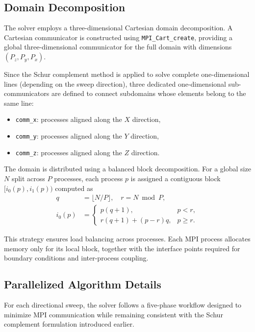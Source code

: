 \documentclass[12pt]{article}
\begin{document}
\subsection{Domain Decomposition}

The solver employs a three-dimensional Cartesian domain decomposition. A Cartesian communicator is constructed using \texttt{MPI\_Cart\_create}, providing a global three-dimensional communicator for the full domain with dimensions $(P_z, P_y, P_x)$.

Since the Schur complement method is applied to solve complete one-dimensional lines (depending on the sweep direction), three dedicated one-dimensional sub-communicators are defined to connect subdomains whose elements belong to the same line:
\begin{itemize}
    \item \texttt{comm\_x}: processes aligned along the $X$ direction,
    \item \texttt{comm\_y}: processes aligned along the $Y$ direction,
    \item \texttt{comm\_z}: processes aligned along the $Z$ direction.
\end{itemize}

The domain is distributed using a balanced block decomposition. For a global size $N$ split across $P$ processes, each process $p$ is assigned a contiguous block $[i_0(p), i_1(p))$ computed as
\begin{align}
    q &= \lfloor N / P \rfloor, \quad r = N \bmod P, \\
    i_0(p) &=
    \begin{cases}
        p(q+1), & p < r, \\
        r(q+1) + (p-r)q, & p \ge r.
    \end{cases}
\end{align}

This strategy ensures load balancing across processes. Each MPI process allocates memory only for its local block, together with the interface points required for boundary conditions and inter-process coupling.
\subsection{Parallelized Algorithm Details}

For each directional sweep, the solver follows a five-phase workflow designed to minimize MPI communication while remaining consistent with the Schur complement formulation introduced earlier.
\end{document}

